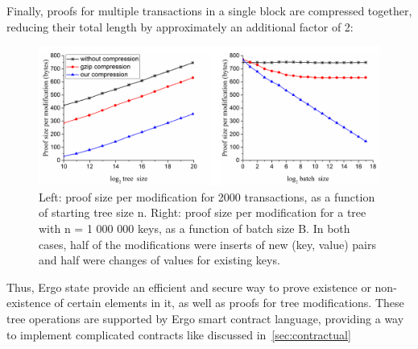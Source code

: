 Finally, proofs for multiple transactions in a single block are compressed together, reducing their total length
by approximately an additional factor of 2:

\begin{figure}[H]
    \centering
    \includegraphics[width=\textwidth]{img/compression.png}
    \caption{Left: proof size per modification for 2000 transactions, as a function of starting tree size n.
    Right: proof size per modification for a tree with n = 1 000 000 keys, as a function of batch size B.
    In both cases, half of the modifications were inserts of new (key, value) pairs and half were changes
    of values for existing keys.
    \label{fig:compression} }
\end{figure}

Thus, Ergo state provide an efficient and secure way to prove existence or non-existence of certain elements in
it, as well as proofs for tree modifications.
These tree operations are supported by Ergo smart contract language, providing a way to implement complicated
contracts like discussed in~\ref{sec:contractual}





